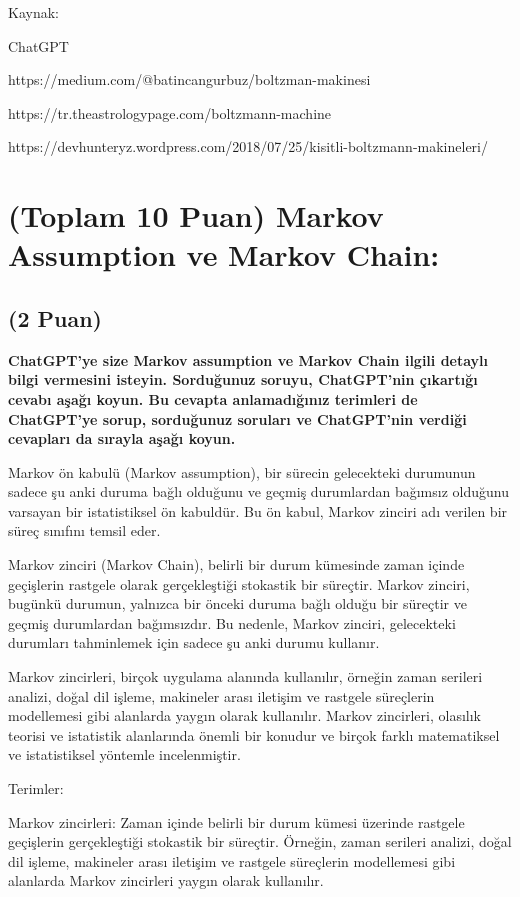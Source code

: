 \documentclass[11pt]{article}
\begin{document}
Kaynak:

ChatGPT

https://medium.com/@batincangurbuz/boltzman-makinesi

https://tr.theastrologypage.com/boltzmann-machine

https://devhunteryz.wordpress.com/2018/07/25/kisitli-boltzmann-makineleri/


\section{(Toplam 10 Puan) Markov Assumption ve Markov Chain:}

\subsection{(2 Puan)} \textbf{ChatGPT’ye size Markov assumption ve Markov Chain ilgili detaylı bilgi vermesini isteyin. Sorduğunuz soruyu, ChatGPT'nin çıkartığı cevabı aşağı koyun. Bu cevapta anlamadığınız terimleri de ChatGPT’ye sorup, sorduğunuz soruları ve ChatGPT’nin verdiği cevapları da sırayla aşağı koyun.}


Markov ön kabulü (Markov assumption), bir sürecin gelecekteki durumunun sadece şu anki duruma bağlı olduğunu ve geçmiş durumlardan bağımsız olduğunu varsayan bir istatistiksel ön kabuldür. Bu ön kabul, Markov zinciri adı verilen bir süreç sınıfını temsil eder.

Markov zinciri (Markov Chain), belirli bir durum kümesinde zaman içinde geçişlerin rastgele olarak gerçekleştiği stokastik bir süreçtir. Markov zinciri, bugünkü durumun, yalnızca bir önceki duruma bağlı olduğu bir süreçtir ve geçmiş durumlardan bağımsızdır. Bu nedenle, Markov zinciri, gelecekteki durumları tahminlemek için sadece şu anki durumu kullanır.

Markov zincirleri, birçok uygulama alanında kullanılır, örneğin zaman serileri analizi, doğal dil işleme, makineler arası iletişim ve rastgele süreçlerin modellemesi gibi alanlarda yaygın olarak kullanılır. Markov zincirleri, olasılık teorisi ve istatistik alanlarında önemli bir konudur ve birçok farklı matematiksel ve istatistiksel yöntemle incelenmiştir.

Terimler:

Markov zincirleri: Zaman içinde belirli bir durum kümesi üzerinde rastgele geçişlerin gerçekleştiği stokastik bir süreçtir. Örneğin, zaman serileri analizi, doğal dil işleme, makineler arası iletişim ve rastgele süreçlerin modellemesi gibi alanlarda Markov zincirleri yaygın olarak kullanılır.
\end{document}
